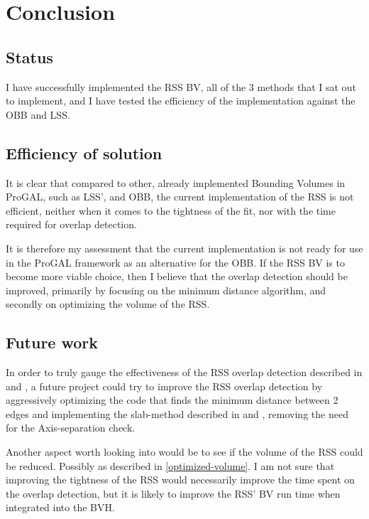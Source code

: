
\section{Conclusion}
\label{conclusion}

\subsection{Status}
I have successfully implemented the RSS BV, all of the 3 methods that I sat out to implement, and I have tested the efficiency of the implementation against the OBB and LSS.

\subsection{Efficiency of solution}
It is clear that compared to other, already implemented Bounding Volumes in ProGAL, such as LSS', and OBB, the current implementation of the RSS is not efficient, neither when it comes to the tightness of the fit, nor with the time required for overlap detection.

It is therefore my assessment that the current implementation is not ready for use in the ProGAL framework as an alternative for the OBB. If the RSS BV is to become more viable choice, then I believe that the overlap detection should be improved, primarily by focusing on the minimum distance algorithm, and secondly on optimizing the volume of the RSS.

\subsection{Future work}
In order to truly gauge the effectiveness of the RSS overlap detection described in \cite{larsen00fast} and \cite{Larsen99fastproximity}, a future project could try to improve the RSS overlap detection by aggressively optimizing the code that finds the minimum distance between 2 edges and implementing the slab-method described in \cite{larsen00fast} and \cite{Larsen99fastproximity}, removing the need for the Axis-separation check.

Another aspect worth looking into would be to see if the volume of the RSS could be reduced. Possibly as described in \ref{optimized-volume}. I am not sure that improving the tightness of the RSS would necessarily improve the time spent on the overlap detection, but it is likely to improve the RSS' BV run time when integrated into the BVH.

